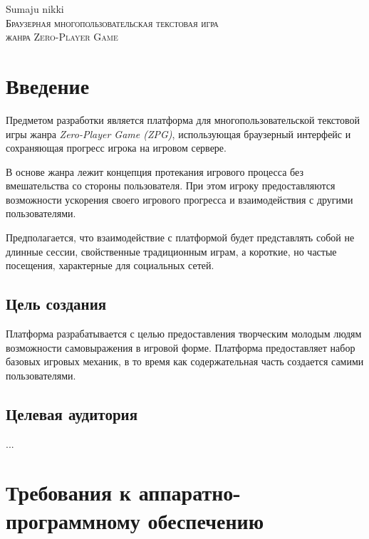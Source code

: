\documentclass[12pt, a4paper]{article}
\begin{document}


\begin{center}
{\namefont\huge Sumaju nikki}\\[6mm]
\textsc{Браузерная многопользовательская текстовая игра\\
жанра Zero-Player Game}
\vspace{4mm}
\end{center}
\tableofcontents
\newpage


\section{Введение}

Предметом разработки является платформа для многопользовательской текстовой игры
жанра \textit{Zero-Player Game (ZPG)}, использующая браузерный интерфейс и
сохраняющая прогресс игрока на игровом сервере.

В основе жанра лежит концепция протекания игрового процесса
без вмешательства со стороны пользователя. При этом игроку предоставляются
возможности ускорения своего игрового прогресса и
взаимодействия с другими пользователями.

Предполагается, что взаимодействие с платформой будет представлять собой
не длинные сессии, свойственные традиционным играм, а короткие, но частые
посещения, характерные для социальных сетей.

\subsection{Цель создания}

Платформа разрабатывается с целью предоставления творческим молодым людям
возможности самовыражения в игровой форме. Платформа предоставляет набор
базовых игровых механик, в то время как содержательная часть создается
самими пользователями.

\subsection{Целевая аудитория}

...

\section{Требования к аппаратно-программному обеспечению}
\end{document}
